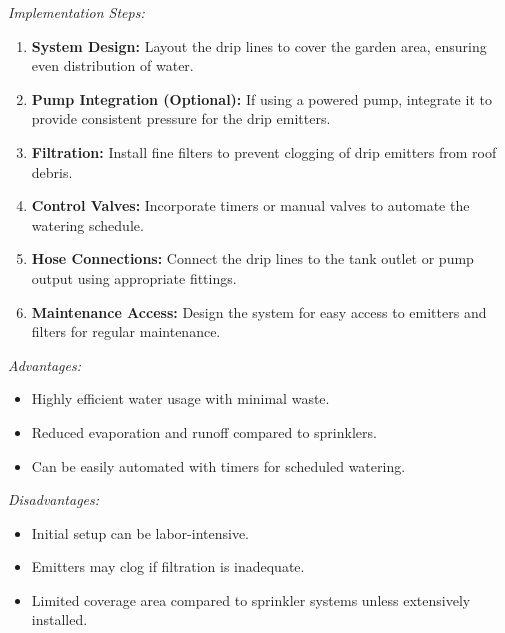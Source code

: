 \documentclass[12pt]{article}
\begin{document}
\noindent\textit{Implementation Steps:}
\begin{enumerate}[noitemsep, topsep=0pt]
\item \textbf{System Design:} Layout the drip lines to cover the garden area, ensuring even distribution of water.
\item \textbf{Pump Integration (Optional):} If using a powered pump, integrate it to provide consistent pressure for the drip emitters.
\item \textbf{Filtration:} Install fine filters to prevent clogging of drip emitters from roof debris.
\item \textbf{Control Valves:} Incorporate timers or manual valves to automate the watering schedule.
\item \textbf{Hose Connections:} Connect the drip lines to the tank outlet or pump output using appropriate fittings.
\item \textbf{Maintenance Access:} Design the system for easy access to emitters and filters for regular maintenance.
\end{enumerate}

\noindent\textit{Advantages:}
\begin{itemize}[noitemsep, topsep=0pt]
\item Highly efficient water usage with minimal waste.
\item Reduced evaporation and runoff compared to sprinklers.
\item Can be easily automated with timers for scheduled watering.
\end{itemize}

\noindent\textit{Disadvantages:}
\begin{itemize}[noitemsep, topsep=0pt]
\item Initial setup can be labor-intensive.
\item Emitters may clog if filtration is inadequate.
\item Limited coverage area compared to sprinkler systems unless extensively installed.
\end{itemize}
\end{document}
